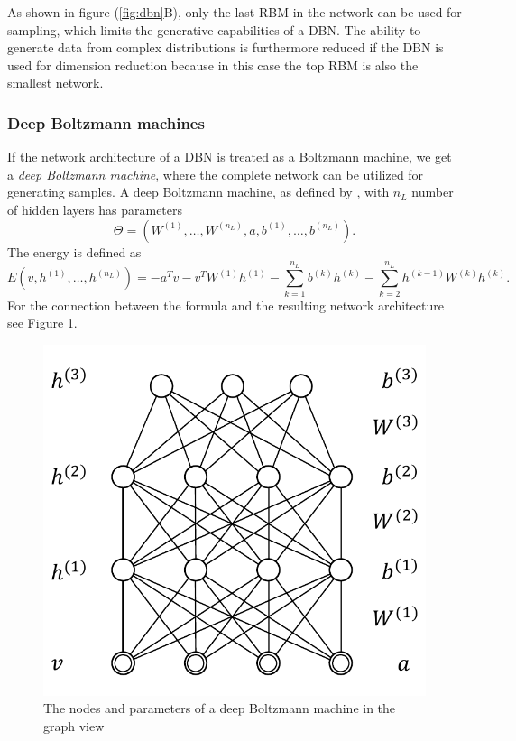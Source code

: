 \documentclass[12pt]{article}
\begin{document}
As shown in figure (\ref{fig:dbn}B), only the last RBM in the network can be used for sampling, which limits the generative capabilities of a DBN.
The ability to generate data from complex distributions is furthermore reduced if the DBN is used for dimension reduction because in this case the top RBM is also the smallest network.


\subsubsection{Deep Boltzmann machines}\label{dbmprobs}

If the network architecture of a DBN is treated as a Boltzmann machine, we get a \emph{deep Boltzmann machine}, where the complete network can be utilized for generating samples.
A deep Boltzmann machine, as defined by \cite{salakhutdinov2009DBMs}, with $n_L$ number of hidden layers has parameters
\[
\Theta = \left (W^{(1)}, \dots, W^{(n_L)}, a, b^{(1)}, \dots, b^{(n_L)} \right).
\]
The energy is defined as
\[
E(v, h^{(1)}, \dots, h^{(n_L)}) = - a^T v - v^T W^{(1)} h^{(1)} - \sum_{k=1}^{n_L} b^{(k)} h^{(k)} -  \sum_{k=2}^{n_L} h^{(k-1)}W^{(k)}h^{(k)}.
\]
For the connection between the formula and the resulting network architecture see Figure \ref{fig:dbmweights}.
\begin{figure}[h]
   \centering
   \includegraphics[scale=0.6]{images/dbmweights.pdf}
   \caption{The nodes and parameters of a deep Boltzmann machine in the graph view}
   \label{fig:dbmweights}
 \end{figure}
\end{document}
